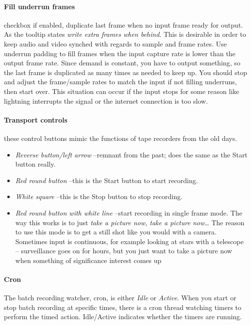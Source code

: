 \paragraph{Fill underrun frames} checkbox if enabled, duplicate last frame when no input frame ready for output.  As the tooltip states \textit{write extra frames when behind}. This is desirable in order to keep audio and video synched with regards to sample and frame rates.  Use underrun padding to fill frames when the input capture rate is lower than the output frame rate.  Since demand is constant, you have to output something, so the last frame is duplicated as many times as needed to keep up.  You should stop and adjust the frame/sample rates to match the input if not filling underruns, then start over.  This situation can occur if the input stops for some reason like lightning interrupts the signal or the internet connection is too slow.
\paragraph{Transport controls} these control buttons mimic the functions of tape recorders from the old days.

\begin{itemize}
    \item \textit{Reverse button/left arrow} --remnant from the past; does the same as the Start button really.
    \item \textit{Red round button} --this is the Start button to start recording.
    \item \textit{White square} --this is the Stop button to stop recording.
    \item \textit{Red round button with white line} --start recording in single frame mode.  The way this works is to just \textit{take a picture now, take a picture now\dots}  The reason to use this mode is to get a still shot like you would with a camera.  Sometimes input is continuous, for example looking at stars with a telescope -- surveillance goes on for hours, but you just want to take a picture now when something of significance interest comes up
\end{itemize}
\paragraph{Cron} The batch recording watcher, cron, is either \textit{Idle} or \textit{Active}.  When you start or stop batch recording at specific times, there is a cron thread watching timers to perform the timed action.  Idle/Active indicates whether the timers are running.
